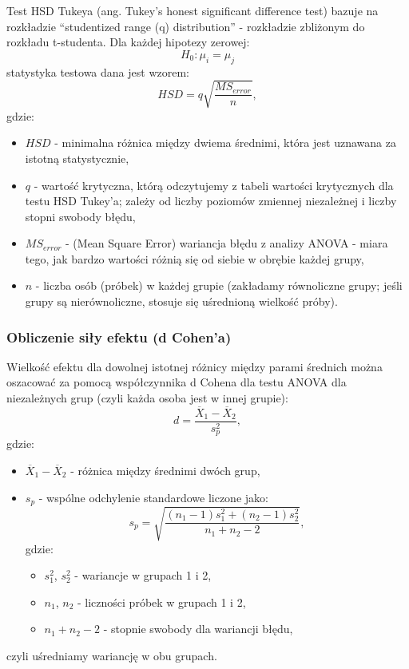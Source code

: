 \documentclass[12pt,a4paper]{article}
\begin{document}
Test HSD Tukeya (ang. Tukey’s honest significant difference test) bazuje na rozkładzie “studentized range
(q) distribution” - rozkładzie zbliżonym do rozkładu t-studenta. Dla każdej hipotezy zerowej: $$H_0 : \mu_i = \mu_j$$
statystyka testowa dana jest wzorem:
$$HSD = q \sqrt{\frac{MS_{error}}{n}},$$
gdzie:
\begin{itemize}
    \item $HSD$ - minimalna różnica między dwiema średnimi, która jest uznawana za istotną statystycznie,
    \item $q$ - wartość krytyczna, którą odczytujemy z tabeli wartości krytycznych dla testu HSD Tukey'a; zależy od liczby poziomów zmiennej niezależnej i liczby stopni swobody błędu,
    \item $MS_{error}$ - (Mean Square Error) wariancja błędu z analizy ANOVA - miara tego, jak bardzo wartości różnią się od siebie w obrębie każdej grupy,
    \item $n$ - liczba osób (próbek) w każdej grupie (zakładamy równoliczne grupy; jeśli grupy są nierównoliczne, stosuje się uśrednioną wielkość próby).
\end{itemize}

\newpage
\subsubsection{Obliczenie siły efektu (d Cohen'a)}
Wielkość efektu dla dowolnej istotnej różnicy między parami średnich można oszacować za pomocą współczynnika d Cohena dla testu ANOVA dla niezależnych grup (czyli każda osoba jest w innej grupie):
$$d=\frac{\overline{X}_1-\overline{X}_2}{s^2_p},$$
gdzie:
\begin{itemize}
    \item $\overline{X}_1-\overline{X}_2$ - różnica między średnimi dwóch grup,
    \item $s_p$ - wspólne odchylenie standardowe liczone jako: $$s_p=\sqrt{\frac{(n_1-1)s^2_1+(n_2-1)s^2_2}{n_1+n_2-2}},$$ gdzie:
    \begin{itemize}
        \item $s^2_1$, $s^2_2$ - wariancje w grupach 1 i 2,
        \item $n_1$, $n_2$ - liczności próbek w grupach 1 i 2,
        \item $n_1+n_2-2$ - stopnie swobody dla wariancji błędu,
    \end{itemize}
\end{itemize}
czyli uśredniamy wariancję w obu grupach.
\end{document}
